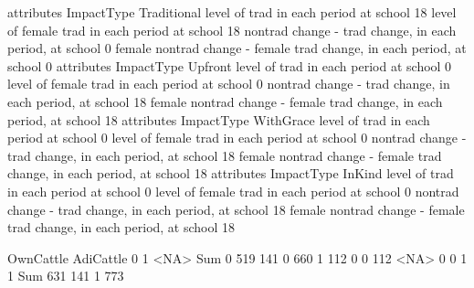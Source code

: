 \begin{Schunk}
\begin{Soutput}
                                                                       attributes
ImpactType                                                              Traditional
  level of trad in each period at school                                         18
  level of female trad in each period at school                                  18
  nontrad change - trad change, in each period, at school                         0
  female nontrad change - female trad change, in each period, at school           0
                                                                       attributes
ImpactType                                                              Upfront
  level of trad in each period at school                                      0
  level of female trad in each period at school                               0
  nontrad change - trad change, in each period, at school                    18
  female nontrad change - female trad change, in each period, at school      18
                                                                       attributes
ImpactType                                                              WithGrace
  level of trad in each period at school                                        0
  level of female trad in each period at school                                 0
  nontrad change - trad change, in each period, at school                      18
  female nontrad change - female trad change, in each period, at school        18
                                                                       attributes
ImpactType                                                              InKind
  level of trad in each period at school                                     0
  level of female trad in each period at school                              0
  nontrad change - trad change, in each period, at school                   18
  female nontrad change - female trad change, in each period, at school     18
\end{Soutput}
\end{Schunk}
\begin{Schunk}
\begin{Soutput}
         OwnCattle
AdiCattle   0   1 <NA> Sum
     0    519 141    0 660
     1    112   0    0 112
     <NA>   0   0    1   1
     Sum  631 141    1 773
\end{Soutput}
\end{Schunk}

